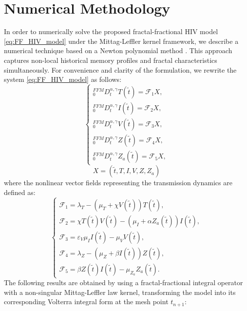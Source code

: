 \documentclass[10pt,a4paper]{amsart}
\numberwithin{equation}{section}
\begin{document}
\section{Numerical Methodology}\label{sec7}
In order to numerically solve the proposed fractal-fractional HIV model \eqref{eq:FF_HIV_model} under the Mittag-Leffler kernel framework, we describe a numerical technique based on a Newton polynomial method \cite{7}. This approach captures non-local historical memory profiles and fractal characteristics simultaneously. For convenience and clarity of the formulation, we rewrite the system \eqref{eq:FF_HIV_model} as follows:
\begin{equation}
\label{eq:functional_form}
\begin{cases}
{}^{FFM}_{0}D_{t}^{\alpha,\gamma} T(\tilde{t}) = \mathcal{F}_1X, \\[6pt]
{}^{FFM}_{0}D_{t}^{\alpha,\gamma} I(\tilde{t}) = \mathcal{F}_2X, \\[6pt]
{}^{FFM}_{0}D_{t}^{\alpha,\gamma} V(\tilde{t}) = \mathcal{F}_3X, \\[6pt]
{}^{FFM}_{0}D_{t}^{\alpha,\gamma} Z(\tilde{t}) = \mathcal{F}_4X, \\[6pt]
{}^{FFM}_{0}D_{t}^{\alpha,\gamma} Z_{a}(\tilde{t}) = \mathcal{F}_5X,
\end{cases}
\end{equation}
\begin{equation*}
X = (\tilde{t}, T, I, V, Z, Z_a)
\end{equation*}
where the nonlinear vector fields representing the transmission dynamics are defined as:
\begin{equation}
\begin{cases}
\mathcal{F}_1 = \lambda_T - (\mu_T + \chi V(\tilde{t}))T(\tilde{t}), \\[6pt]
\mathcal{F}_2 = \chi T(\tilde{t})V(\tilde{t}) - (\mu_I  + \alpha Z_{a}(\tilde{t}))I(\tilde{t}), \\[6pt]
\mathcal{F}_3 = \varepsilon_V \mu_I I(\tilde{t}) - \mu_V V(\tilde{t}), \\[6pt]
\mathcal{F}_4 = \lambda_Z - (\mu_Z  + \beta  I(\tilde{t}))Z(\tilde{t}), \\[6pt]
\mathcal{F}_5 = \beta Z(\tilde{t}) I(\tilde{t}) - \mu_{Z_a} Z_{a}(\tilde{t}).
\end{cases}
\end{equation}
The following results are obtained by using a fractal-fractional integral operator with a non-singular Mittag-Leffler law kernel, transforming the model into its corresponding Volterra integral form at the mesh point $t_{n+1}$:
\end{document}
